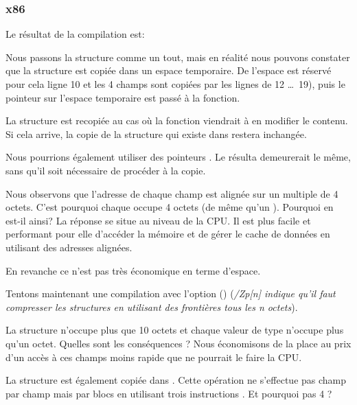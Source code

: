 ﻿\subsubsection{x86}

Le résultat de la compilation est:



Nous passons la structure comme un tout, mais en réalité nous pouvons constater que la structure est copiée 
dans un espace temporaire. De l'espace est réservé pour cela ligne 10 et les 4 champs sont copiées par les 
lignes de 12 \ldots\ 19), puis le pointeur sur l'espace temporaire est passé à la fonction.

La structure est recopiée au cas où la fonction \ttf{} viendrait à en modifier le contenu. Si cela arrive, 
la copie de la structure qui existe dans \main restera inchangée.

Nous pourrions également utiliser des pointeurs \CCpp. Le résulta demeurerait le même, sans qu'il soit 
nécessaire de procéder à la copie.

Nous observons que l'adresse de chaque champ est alignée sur un multiple de 4  octets. C'est pourquoi chaque 
\Tchar occupe 4 octets (de même qu'un \Tint). Pourquoi en est-il ainsi? La réponse se situe au niveau de la 
CPU. Il est plus facile et performant pour elle d'accéder la mémoire et de gérer le cache de données en 
utilisant des adresses alignées.

En revanche ce n'est pas très économique en terme d'espace.

Tentons maintenant une compilation avec l'option () (\emph{/Zp[n] indique qu'il faut compresser les 
structures en utilisant des frontières tous les n octets}).



La structure n'occupe plus que 10 octets et chaque valeur de type \Tchar n'occupe plus qu'un octet. Quelles 
sont les conséquences ? Nous économisons de la place au prix d'un accès à ces champs moins rapide que ne 
pourrait le faire la CPU.

\label{short_struct_copying_using_MOV}

La structure est également copiée dans \main. Cette opération ne s'effectue pas champ par champ mais par 
blocs en utilisant trois instructions \MOV. Et pourquoi pas 4 ?

